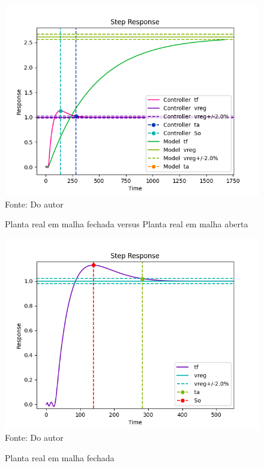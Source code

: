 \begin{figure}[H]
    \centering
    \caption{Planta real em malha fechada versus Planta real em malha aberta}
    \includegraphics[scale=0.8]{figuras/real_planta_ctrl1}
    \label{fig:real_planta_ctrl1}
    \\
    \vspace{0cm}\hspace{0cm}\small{Fonte: Do autor}
\end{figure}

\begin{figure}[H]
    \centering
    \caption{Planta real em malha fechada}
    \includegraphics[scale=0.8]{figuras/real_planta_ctrl2}
    \label{fig:real_planta_ctrl2}
    \\
    \vspace{0cm}\hspace{0cm}\small{Fonte: Do autor}
\end{figure}



